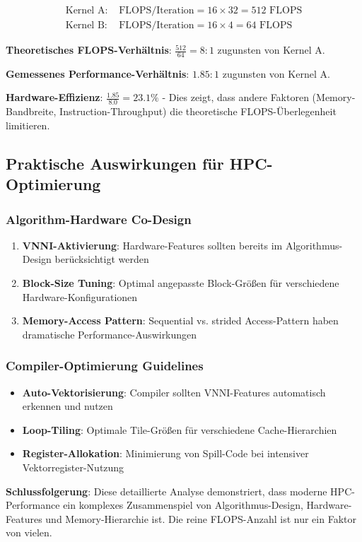 \documentclass[11pt,a4paper]{article}
\begin{document}
\begin{align}
\text{Kernel A: } &\text{FLOPS/Iteration} = 16 \times 32 = 512 \text{ FLOPS} \\
\text{Kernel B: } &\text{FLOPS/Iteration} = 16 \times 4 = 64 \text{ FLOPS}
\end{align}

\textbf{Theoretisches FLOPS-Verhältnis}: $\frac{512}{64} = 8:1$ zugunsten von Kernel A.

\textbf{Gemessenes Performance-Verhältnis}: $1.85:1$ zugunsten von Kernel A.

\textbf{Hardware-Effizienz}: $\frac{1.85}{8.0} = 23.1\%$ - Dies zeigt, dass andere Faktoren (Memory-Bandbreite, Instruction-Throughput) die theoretische FLOPS-Überlegenheit limitieren.

\subsection{Praktische Auswirkungen für HPC-Optimierung}

\subsubsection{Algorithm-Hardware Co-Design}

\begin{enumerate}
\item \textbf{VNNI-Aktivierung}: Hardware-Features sollten bereits im Algorithmus-Design berücksichtigt werden
\item \textbf{Block-Size Tuning}: Optimal angepasste Block-Größen für verschiedene Hardware-Konfigurationen
\item \textbf{Memory-Access Pattern}: Sequential vs. strided Access-Pattern haben dramatische Performance-Auswirkungen
\end{enumerate}

\subsubsection{Compiler-Optimierung Guidelines}

\begin{itemize}
\item \textbf{Auto-Vektorisierung}: Compiler sollten VNNI-Features automatisch erkennen und nutzen
\item \textbf{Loop-Tiling}: Optimale Tile-Größen für verschiedene Cache-Hierarchien
\item \textbf{Register-Allokation}: Minimierung von Spill-Code bei intensiver Vektorregister-Nutzung
\end{itemize}

\textbf{Schlussfolgerung}: Diese detaillierte Analyse demonstriert, dass moderne HPC-Performance ein komplexes Zusammenspiel von Algorithmus-Design, Hardware-Features und Memory-Hierarchie ist. Die reine FLOPS-Anzahl ist nur ein Faktor von vielen.
\end{document}
